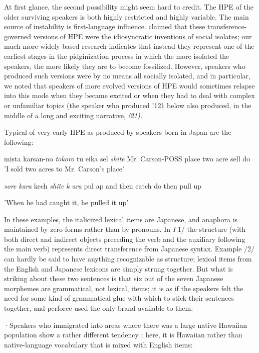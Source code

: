 At first glance, the second possibility might seem hard to credit. The HPE of the older surviving speakers is both highly restricted and highly variable. The main source of instability is first-language influ\-ence. \citet{Labov1971} claimed that these transference-governed versions of HPE were the idiosyncratic inventions of social isolates; our much more widely-based research indicates that instead they represent one of the earliest stages in the pidginization process in which the more isolated the speakers, the more likely they are to become fossilized. However, speakers who produced such versions were by no means all socially isolated, and in particular, we noted that speakers of more evolved versions of HPE would sometimes relapse into this mode when they became excited or when they had to deal with complex or un\-familiar topics (the speaker who produced !121 below also produced, in the middle of a long and exciting narrative, \textit{!21).}

Typical of very early HPE as produced by speakers born in Japan are the following:

\ea\label{ex:1}
 mista karsan-no \textit{to}\textit{k}\textit{oro} tu eika sel \textit{shite} Mr. Carson-POSS place two acre sell do 'I sold two acres to Mr. Carson's place'
\glt
\z

\ea\label{ex:2}
 \textit{sore} \textit{kara} kech \textit{shite} \textit{k} \textit{ara} pul ap and then catch do then pull up
\glt
\z

'When he had caught it, he pulled it up'


In these examples, the italicized lexical items are Japanese, and ana\-phora is maintained by zero forms rather than by pronouns. In \textit{I} 1/ the structure (with both direct and indirect objects preceding the verb and the auxiliary following the main verb) represents direct transference from Japanese syntax. Example /2/ can hardly be said to have anything recognizable as structure; lexical items from the English and Japanese lexicons are simply strung together. But what is striking about these two sentences is that six out of the seven Japanese morphemes are grammatical, not lexical, items; it is as if the speakers felt the need for some kind of grammatical glue with which to stick their sentences together, and perforce used the only brand available to them.

·Speakers who immigrated into areas where there was a large native-Hawaiian population show a rather different tendency ; here, it is Hawaiian rather than native-language vocabulary that is mixed with English items:

